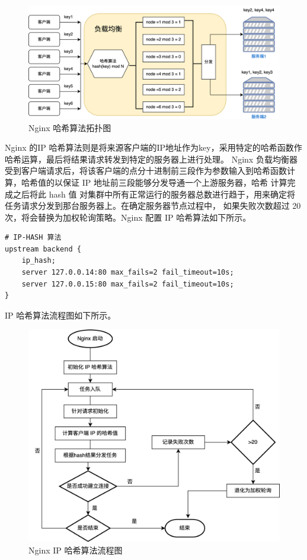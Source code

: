 \begin{figure}[htb]
  \centering
  \includegraphics[width=\textwidth]{figures/hash-algo.png}
  \caption{Nginx 哈希算法拓扑图}
\end{figure}

Nginx 的IP 哈希算法则是将来源客户端的IP地址作为key，采用特定的哈希函数作哈希运算，最后将结果请求转发到特定的服务器上进行处理。
Nginx 负载均衡器受到客户端请求后，将该客户端的点分十进制前三段作为参数输入到哈希函数计算，哈希值的以保证 IP 地址前三段能够分发导通一个上游服务器，哈希
计算完成之后将此 hash 值 对集群中所有正常运行的服务器总数进行趋于，用来确定将任务请求分发到那台服务器上。在确定服务器节点过程中，
如果失败次数超过 20 次，将会替换为加权轮询策略。Nginx 配置 IP 哈希算法如下所示。

\begin{lstlisting}
# IP-HASH 算法
upstream backend {
    ip_hash;
    server 127.0.0.14:80 max_fails=2 fail_timeout=10s;
    server 127.0.0.15:80 max_fails=2 fail_timeout=10s;
}
\end{lstlisting}

IP 哈希算法流程图如下所示。

\begin{figure}[htb]
  \centering
  \includegraphics[width=\textwidth]{figures/hash-flowchart.png}
  \caption{Nginx IP 哈希算法流程图}
\end{figure}

